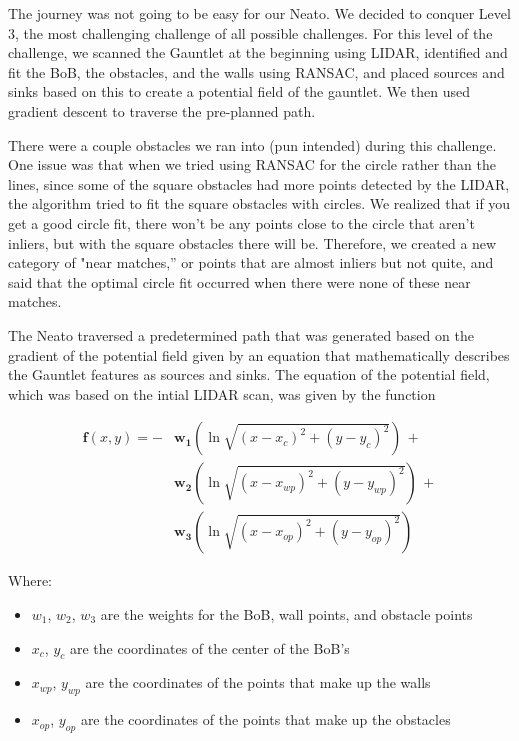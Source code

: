 The journey was not going to be easy for our Neato. We decided to conquer Level 3, the most challenging challenge of all possible challenges. For this level of the challenge, we scanned the Gauntlet at the beginning using LIDAR, identified and fit the BoB, the obstacles, and the walls using RANSAC, and placed sources and sinks based on this to create a potential field of the gauntlet. We then used gradient descent to traverse the pre-planned path.

There were a couple obstacles we ran into (pun intended) during this challenge. One issue was that when we tried using RANSAC for the circle rather than the lines, since some of the square obstacles had more points detected by the LIDAR, the algorithm tried to fit the square obstacles with circles. We realized that if you get a good circle fit, there won't be any points close to the circle that aren't inliers, but with the square obstacles there will be. Therefore, we created a new category of "near matches,” or points that are almost inliers but not quite, and said that the optimal circle fit occurred when there were none of these near matches.

The Neato traversed a predetermined path that was generated based on the gradient of the potential field given by an equation that mathematically describes the Gauntlet features as sources and sinks. The equation of the potential field, which was based on the intial LIDAR scan, was given by the function

\begin{align*}
    \boldsymbol{f}(x,y) = -&\boldsymbol{w_1}(\ln{\sqrt{(x-x_c)^2+(y-y_c)^2}})\,+ \\
    &\boldsymbol{w_2}(\ln{\sqrt{(x-x_{wp})^2+(y-y_{wp})^2}})\,+ \\
    &\boldsymbol{w_3}(\ln{\sqrt{(x-x_{op})^2+(y-y_{op})^2}})
\end{align*}

\vspace{.1in}

Where:

\begin{itemize}
    \item $w_1$, $w_2$, $w_3$ are the weights for the BoB, wall points, and obstacle points
    \item $x_c$, $y_c$ are the coordinates of the center of the BoB's 
    \item $x_{wp}$, $y_{wp}$ are the coordinates of the points that make up the walls
    \item $x_{op}$, $y_{op}$ are the coordinates of the points that make up the obstacles 
\end{itemize}

